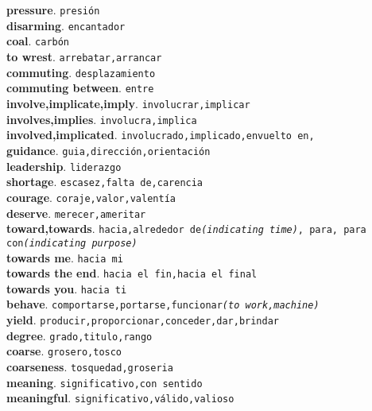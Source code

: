 \documentclass[twocolumn]{article}
\begin{document}
	\textsf{\textbf{pressure}}. \texttt{presi\'on}\\
	\textsf{\textbf{disarming}}. \texttt{encantador}\\
	\textsf{\textbf{coal}}. \texttt{carb\'on}\\
	\textsf{\textbf{to wrest}}. \texttt{arrebatar,arrancar}\\
	\textsf{\textbf{commuting}}. \texttt{desplazamiento}\\
	\textsf{\textbf{commuting between}}. \texttt{entre}\\
	\textsf{\textbf{involve,implicate,imply}}. \texttt{involucrar,implicar}\\
	\textsf{\textbf{involves,implies}}. \texttt{involucra,implica}\\
	\textsf{\textbf{involved,implicated}}. \texttt{involucrado,implicado,envuelto en,}\\
	\textsf{\textbf{guidance}}. \texttt{guia,direcci\'on,orientaci\'on}\\
	\textsf{\textbf{leadership}}. \texttt{liderazgo}\\
	\textsf{\textbf{shortage}}. \texttt{escasez,falta de,carencia}\\
	\textsf{\textbf{courage}}. \texttt{coraje,valor,valent\'ia}\\
	\textsf{\textbf{deserve}}. \texttt{merecer,ameritar}\\
	\textsf{\textbf{toward,towards}}. \texttt{hacia,alrededor de{\scriptsize \textsl{(indicating time)}}, para, para con{\scriptsize \textsl{(indicating purpose)}}}\\
	\textsf{\textbf{towards me}}. \texttt{hacia mi}\\
	\textsf{\textbf{towards the end}}. \texttt{hacia el fin,hacia el final}\\
	\textsf{\textbf{towards you}}. \texttt{hacia ti}\\
	\textsf{\textbf{behave}}. \texttt{comportarse,portarse,funcionar{\scriptsize \textsl{(to work,machine)}}}\\
	\textsf{\textbf{yield}}. \texttt{producir,proporcionar,conceder,dar,brindar}\\
	\textsf{\textbf{degree}}. \texttt{grado,titulo,rango}\\
	\textsf{\textbf{coarse}}. \texttt{grosero,tosco}\\
	\textsf{\textbf{coarseness}}. \texttt{tosquedad,groseria}\\
	\textsf{\textbf{meaning}}. \texttt{significativo,con sentido}\\
	\textsf{\textbf{meaningful}}. \texttt{significativo,v\'alido,valioso}\\
\end{document}
